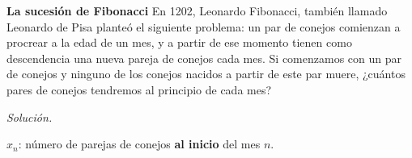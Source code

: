 {\nologo
\begin{frame} 
	
	\begin{ejer}{\textbf{La sucesión de Fibonacci}} \justifying
		En 1202, Leonardo Fibonacci, también llamado Leonardo de Pisa planteó el siguiente problema: 
		un par de  conejos comienzan a procrear a la edad de un mes, y a partir de ese momento tienen como
		descendencia una nueva pareja de conejos cada mes. Si comenzamos con un par de
		conejos y ninguno de los conejos nacidos a partir de este par muere, ¿cuántos pares
		de conejos tendremos al principio de cada mes?
	\end{ejer}
	
	\textit{Solución.}
	
	\vspace{1mm}
	
	$x_n$: número de parejas de conejos \textbf{al inicio} del mes $n$.
	
	\vspace{3mm}
	

\end{frame}}
